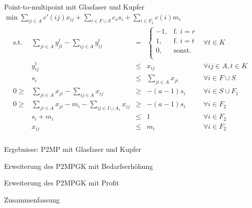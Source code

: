 \documentclass{beamer}
\begin{document}
\begin{frame}{Point-to-multipoint mit Glasfaser und Kupfer}
	  $\min \displaystyle\sum_{ij \in A} c'(ij) x_{ij} + \displaystyle\sum_{i \in F \cup S} c_s s_i + \displaystyle\sum_{i \in F_2} c(i) m_i$
	  \begin{align*}
	  \begin{array}{ccrcl}
	  \textrm{s.t.}  
	   &\displaystyle\sum_{ji \in A} y_{ji}^t - \displaystyle\sum_{ij \in A} y_{ij}^t& = & \left\{\begin{array}{cl} 
	  -1, & \text{f. } i=r\\ 
	  1, & \text{f. } i=t\\ 
	  0, & \text{sonst.}\\ 
	  \end{array}
	  \right. & \forall t \in K \\
	  & y_{ij}^t & \leq & x_{ij} & \forall ij \in A, t\in K \\
	  & s_i &\leq& \displaystyle\sum_{ji \in A} x_{ji}& \forall  i \in F \cup S \\ 
	  0\geq&\displaystyle\sum_{ji \in A} x_{ji} - \displaystyle\sum_{ij \in A} x_{ij}&\geq& -(a-1)s_i & \forall i \in S \cup F_1\\
	  0\geq&\displaystyle\sum_{ji \in A} x_{ji} -m_i - \displaystyle\sum_{ij \in I \cup A_1} x_{ij}&\geq& -(a-1)s_i & \forall i \in F_2\\
	  &s_i+m_i & \leq & 1 & \forall i \in F_2 \\
	  &x_{ij}& \leq & m_i & \forall i \in F_2 \\
	  \end{array}
	  \end{align*}
\end{frame}

\begin{frame}{Ergebnisse: P2MP mit Glasfaser und Kupfer}
\end{frame}
	
\begin{frame}{Erweiterung des P2MPGK mit Bedarfserhöhung}

\end{frame}

\begin{frame}{Erweiterung des P2MPGK mit Profit}
	
\end{frame}

\begin{frame}{Zusammenfassung}

\end{frame}

	
\end{document}
